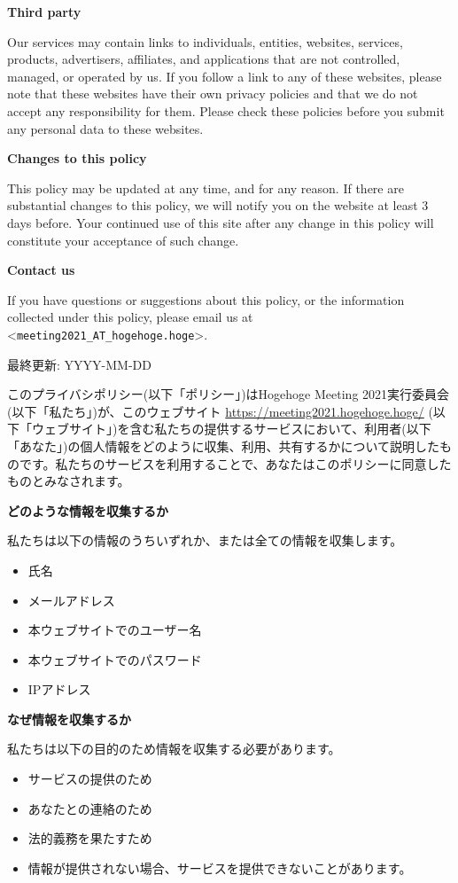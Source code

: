 \documentclass[titlepage,10pt,a4paper,uplatex]{jsbook}
\newenvironment{content}{\begin{shaded}\vspace{-1em}\raggedright\ttfamily\footnotesize\setlength{\baselineskip}{1.4em}}{\end{shaded}\vspace{-1em}}
\renewcommand{\textbf}[1]{{\bfseries\sffamily#1}}
\begin{document}
\begin{content}
\textbf{\Large Third party}

Our services may contain links to individuals, entities, websites, services, products, advertisers, affiliates, and applications that are not controlled, managed, or operated by us. If you follow a link to any of these websites, please note that these websites have their own privacy policies and that we do not accept any responsibility for them. Please check these policies before you submit any personal data to these websites.

\textbf{\Large Changes to this policy}

This policy may be updated at any time, and for any reason. If there are substantial changes to this policy, we will notify you on the website at least 3 days before. Your continued use of this site after any change in this policy will constitute your acceptance of such change.

\textbf{\Large Contact us}

If you have questions or suggestions about this policy, or the information collected under this policy, please email us at {\textless}\texttt{meeting2021\_AT\_hogehoge.hoge}{\textgreater}.

最終更新: YYYY-MM-DD

このプライバシポリシー(以下「ポリシー」)はHogehoge Meeting 2021実行委員会(以下「私たち」)が、このウェブサイト \url{https://meeting2021.hogehoge.hoge/} (以下「ウェブサイト」)を含む私たちの提供するサービスにおいて、利用者(以下「あなた」)の個人情報をどのように収集、利用、共有するかについて説明したものです。私たちのサービスを利用することで、あなたはこのポリシーに同意したものとみなされます。

\textbf{\Large どのような情報を収集するか}

私たちは以下の情報のうちいずれか、または全ての情報を収集します。

\begin{itemize}
\item 氏名
\item メールアドレス
\item 本ウェブサイトでのユーザー名
\item 本ウェブサイトでのパスワード
\item IPアドレス
\end{itemize}

\textbf{\Large なぜ情報を収集するか}

私たちは以下の目的のため情報を収集する必要があります。

\begin{itemize}
\item サービスの提供のため
\item あなたとの連絡のため
\item 法的義務を果たすため
\item 情報が提供されない場合、サービスを提供できないことがあります。
\end{itemize}


\end{content}
\end{document}

